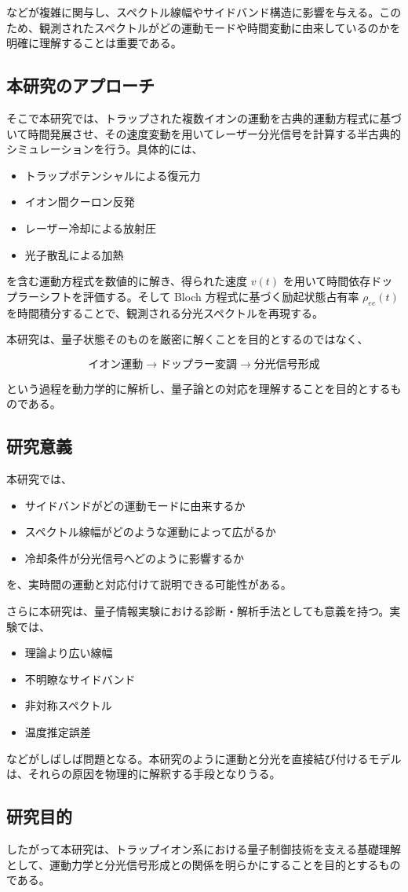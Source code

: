 などが複雑に関与し、スペクトル線幅やサイドバンド構造に影響を与える。このため、観測されたスペクトルがどの運動モードや時間変動に由来しているのかを明確に理解することは重要である。

\subsection{本研究のアプローチ}

そこで本研究では、トラップされた複数イオンの運動を古典的運動方程式に基づいて時間発展させ、その速度変動を用いてレーザー分光信号を計算する半古典的シミュレーションを行う。具体的には、

\begin{itemize}
    \item トラップポテンシャルによる復元力
    \item イオン間クーロン反発
    \item レーザー冷却による放射圧
    \item 光子散乱による加熱
\end{itemize}

を含む運動方程式を数値的に解き、得られた速度 $v(t)$ を用いて時間依存ドップラーシフトを評価する。そして Bloch 方程式に基づく励起状態占有率 $\rho_{ee}(t)$ を時間積分することで、観測される分光スペクトルを再現する。

本研究は、量子状態そのものを厳密に解くことを目的とするのではなく、

\[
    \text{イオン運動}
    \rightarrow
    \text{ドップラー変調}
    \rightarrow
    \text{分光信号形成}
\]

という過程を動力学的に解析し、量子論との対応を理解することを目的とするものである。

\subsection{研究意義}

本研究では、

\begin{itemize}
    \item サイドバンドがどの運動モードに由来するか
    \item スペクトル線幅がどのような運動によって広がるか
    \item 冷却条件が分光信号へどのように影響するか
\end{itemize}

を、実時間の運動と対応付けて説明できる可能性がある。

さらに本研究は、量子情報実験における診断・解析手法としても意義を持つ。実験では、

\begin{itemize}
    \item 理論より広い線幅
    \item 不明瞭なサイドバンド
    \item 非対称スペクトル
    \item 温度推定誤差
\end{itemize}

などがしばしば問題となる。本研究のように運動と分光を直接結び付けるモデルは、それらの原因を物理的に解釈する手段となりうる。

\subsection{研究目的}

したがって本研究は、トラップイオン系における量子制御技術を支える基礎理解として、運動力学と分光信号形成との関係を明らかにすることを目的とするものである。